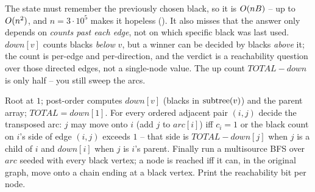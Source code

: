 \begin{thinkbox}
{The state must remember the previously chosen black, so it is $O(n B)$ -- up to
$O(n^2)$, and $n=3\cdot10^5$ makes it hopeless (\tle). It also misses that the
answer only depends on \emph{counts past each edge}, not on which specific black
was last used.}
{$\mathit{down}[v]$ counts blacks \emph{below} $v$, but a winner can be decided by
blacks \emph{above} it; the count is per-edge and per-direction, and the verdict is
a reachability question over those directed edges, not a single-node value. The up
count $\mathit{TOTAL}-\mathit{down}$ is only half -- you still sweep the arcs.}
\end{thinkbox}

Root at $1$; post-order computes $\mathit{down}[v]$ (blacks in $\operatorname{subtree}(v)$) and
the parent array; $\mathit{TOTAL}=\mathit{down}[1]$. For every ordered adjacent
pair $(i,j)$ decide the transposed arc: $j$ may move onto $i$ (add $j$ to
$\mathit{arc}[i]$) iff $c_i=1$ or the black count on $i$'s side of edge $(i,j)$
exceeds $1$ -- that side is $\mathit{TOTAL}-\mathit{down}[j]$ when $j$ is a child of
$i$ and $\mathit{down}[i]$ when $j$ is $i$'s parent. Finally run a multisource
BFS over $\mathit{arc}$ seeded with every black vertex; a node is reached iff it
can, in the original graph, move onto a chain ending at a black vertex. Print the
reachability bit per node.

